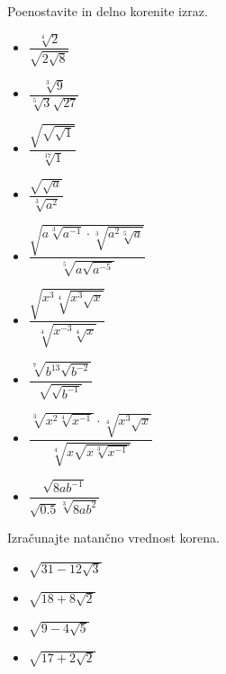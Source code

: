         
            \begin{naloga}
                Poenostavite in delno korenite izraz.
                \begin{multicols}{2}
                    \begin{itemize}
                        \item $\displaystyle \dfrac{\sqrt[4]{2}}{\sqrt{2\sqrt{8}}}$ 
                        \item $\displaystyle \dfrac{\sqrt[3]{9}}{\sqrt[5]{3}\sqrt{27}}$ 
                        \item $\displaystyle \dfrac{\sqrt{\sqrt{\sqrt{1}}}}{\sqrt[17]{1}}$ 
                        \item $\displaystyle \dfrac{\sqrt{\sqrt{a}}}{\sqrt[3]{a^2}}$ 
                        \item $\displaystyle \dfrac{\sqrt{a\sqrt[3]{a^{-1}}\cdot\sqrt[3]{a^2\sqrt[5]{a}}}}{\sqrt[5]{a\sqrt{a^{-5}}}}$ 
                        \item $\displaystyle \dfrac{\sqrt{x^3\sqrt[4]{x^3\sqrt{x}}}}{\sqrt[4]{x^{-3}\sqrt[4]{x}}}$ 
                        \item $\displaystyle \dfrac{\sqrt[7]{b^{13}\sqrt{b^{-2}}}}{\sqrt{\sqrt{b^{-1}}}}$ 
                        \item $\displaystyle \dfrac{\sqrt[3]{x^2\sqrt[4]{x^{-1}}}\cdot\sqrt[4]{x^3\sqrt{x}}}{\sqrt[4]{x\sqrt{x\sqrt[3]{x^{-1}}}}}$ 
                        \item $\displaystyle \dfrac{\sqrt{8ab^{-1}}}{\sqrt{0.5}\sqrt[3]{8ab^2}}$ 
                    \end{itemize}
                \end{multicols}
            \end{naloga}
        
        
            \begin{naloga}
                Izračunajte natančno vrednost korena.
                \begin{itemize}
                    \item $\displaystyle \sqrt{31-12\sqrt{3}}$ 
                    \item $\displaystyle \sqrt{18+8\sqrt{2}}$ 
                    \item $\displaystyle \sqrt{9-4\sqrt{5}}$ 
                    \item $\displaystyle \sqrt{17+2\sqrt{2}}$ 
                \end{itemize}
                
            \end{naloga}
        

